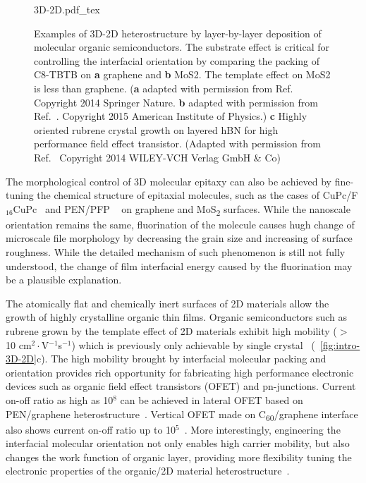 \begin{figure}[htbp]
  \centering
  {3D-2D.pdf_tex}
  \caption{\label{fig:intro-3D-2D}%
    Examples of 3D-2D heterostructure by layer-by-layer deposition of
    molecular organic semiconductors. The substrate effect is critical
    for controlling the interfacial orientation by comparing the
    packing of C8-TBTB on \textbf{a} graphene and \textbf{b} MoS2. The
    template effect on MoS2 is less than graphene. (\textbf{a} adapted
    with permission from Ref.~\cite{He_2014_C8BTBT_gr} Copyright 2014
    Springer Nature. \textbf{b} adapted with permission from
    Ref.~\cite{He_2015_C8BTBT_MoS2}. Copyright 2015 American Institute
    of Physics.) \textbf{c} Highly oriented rubrene crystal growth on
    layered hBN for high performance field effect transistor. (Adapted
    with permission from Ref.~\cite{Lee_2014_rubene_hBN} Copyright
    2014 WILEY-VCH Verlag GmbH \& Co)%
  }
\end{figure}

The morphological control of 3D molecular epitaxy can also be achieved
by fine-tuning the chemical structure of epitaxial molecules, such as
the cases of
CuPc/F\(_{\text{16}}\)CuPc~\cite{Singha_Roy_2012_CuPc_gr_glass,Xiao_2013_jacs_CuPc_gr,Zhong_2012_gr_F16_pn_junc,Yang_2011_F16CUPc_nanowire}
and
PEN/PFP ~\cite{Salzmann_2012_fpen_gr,Breuer_2011_pent_graph}
on graphene and MoS\textsubscript{2} surfaces.
%
While the nanoscale orientation remains the same, fluorination of the
molecule causes hugh change of micro\-scale file morphology by
decreasing the grain size and increasing of surface roughness.
%
While the detailed mechanism of such phenomenon is still not fully
understood, the change of film interfacial energy caused by the
fluorination may be a plausible explanation.

The atomically flat and chemically inert surfaces of 2D materials
allow the growth of highly crystalline organic thin films. Organic
semiconductors such as rubrene grown by the template effect of 2D
materials exhibit high mobility ($>$ 10 cm$^{2}\cdot$V$^{-1}$s$^{-1}$)
which is previously only achievable by single
crystal~\cite{Lee_2014_rubene_hBN} (~\autoref{fig:intro-3D-2D}c).
%
The high mobility brought by interfacial molecular packing and
orientation provides rich opportunity for fabricating high performance
electronic devices such as organic field effect transistors (OFET) and
pn-junctions.
%
Current on-off ratio as high as 10$^{8}$ can be achieved in lateral
OFET based on PEN/graphene heterostructure~\cite{Lee_2011_pentacene}.
%
Vertical OFET made on C\textsubscript{60}/graphene interface also
shows current on-off ratio up to
10$^{5}$~\cite{Shih_2015_PartiallyScreened}.
%
More interestingly, engineering the interfacial molecular orientation
not only enables high carrier mobility, but also changes the work
function of organic layer, providing more flexibility tuning the
electronic properties of the organic/2D material
heterostructure~\cite{Zhong_2014_gr_F16_EF,Wu_2013_CuPc_F16_gr}.



